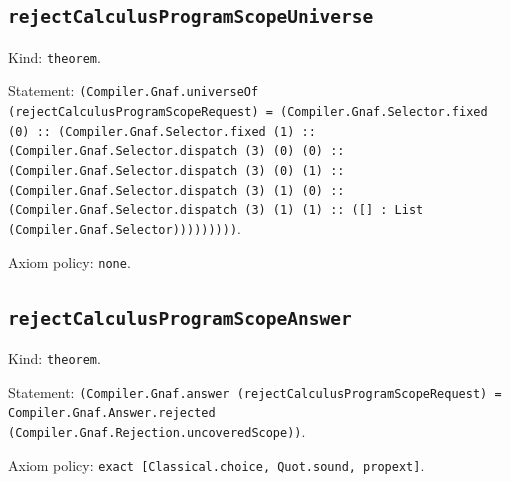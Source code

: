 \documentclass[11pt]{article}
\begin{document}
\subsection*{\texttt{rejectCalculusProgramScopeUniverse}}
\noindent Kind: \texttt{theorem}.\par
\noindent Statement: \texttt{(Compiler.Gnaf.universeOf (rejectCalculusProgramScopeRequest) = (Compiler.Gnaf.Selector.fixed (0) :: (Compiler.Gnaf.Selector.fixed (1) :: (Compiler.Gnaf.Selector.dispatch (3) (0) (0) :: (Compiler.Gnaf.Selector.dispatch (3) (0) (1) :: (Compiler.Gnaf.Selector.dispatch (3) (1) (0) :: (Compiler.Gnaf.Selector.dispatch (3) (1) (1) :: ([] : List (Compiler.Gnaf.Selector)))))))))}.\par
\noindent Axiom policy: \texttt{none}.\par
\subsection*{\texttt{rejectCalculusProgramScopeAnswer}}
\noindent Kind: \texttt{theorem}.\par
\noindent Statement: \texttt{(Compiler.Gnaf.answer (rejectCalculusProgramScopeRequest) = Compiler.Gnaf.Answer.rejected (Compiler.Gnaf.Rejection.uncoveredScope))}.\par
\noindent Axiom policy: \texttt{exact [Classical.choice, Quot.sound, propext]}.\par
\end{document}
